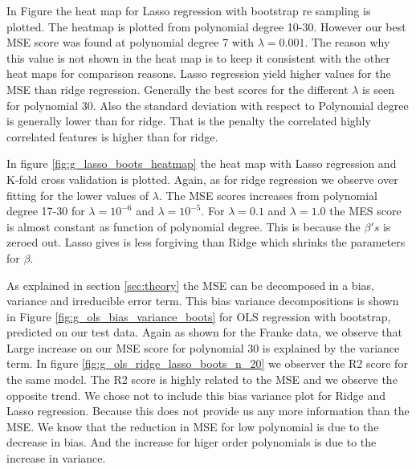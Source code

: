 In Figure \label{fig:g_lasso_boots_heatmap} the heat map for Lasso regression
with bootstrap re sampling is plotted. The heatmap is plotted from polynomial
degree 10-30. However our best MSE score was found at polynomial degree 7 with
$\lambda = 0.001$. The reason why this value is not shown in the heat map is to
keep it consistent with the other heat maps for comparison reasons. Lasso
regression yield higher values for the MSE than ridge regression. Generally the
best scores for the different $\lambda $ is seen for polynomial 30. Also the
standard deviation with respect to Polynomial degree is generally lower than
for ridge. That is the penalty the correlated highly correlated features is
higher than for ridge.  

In figure \ref{fig:g_lasso_boots_heatmap} the heat map with Lasso regression
and K-fold cross validation is plotted. Again, as for ridge regression we
observe over fitting for the lower values of $\lambda $.
The MSE scores increases from polynomial degree 17-30 for $\lambda = 10^{-6}$
and $\lambda  = 10^{-5}$. For $\lambda = 0.1$ and $\lambda = 1.0$ the MES score
is almost constant as function of polynomial degree. This is because the
$\beta's$ is zeroed out. Lasso gives is less forgiving than Ridge which shrinks
the parameters for $\beta$. 

As explained in section \ref{sec:theory} the MSE can be decomposed in a bias,
variance and irreducible error term. This bias variance decompositions is shown
in Figure \ref{fig:g_ols_bias_variance_boots} for OLS regression with
bootstrap, predicted on our test data. Again as shown for the Franke
data, we observe that Large increase on our MSE score for polynomial 30 is
explained by the variance term. In figure
\ref{fig:g_ols_ridge_lasso_boots_n_20} we observer the R2 score for the same
model. The R2 score is highly related to the MSE and we observe the opposite
trend. We chose not to include this bias variance plot for Ridge and Lasso
regression. Because this does not provide us any more information than the MSE.
We know that the reduction in MSE for low polynomial is due to the decrease in
bias. And the increase for higer order polynomials is due to the increase in
variance. 



